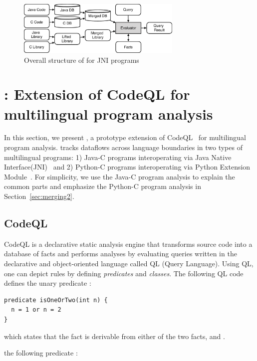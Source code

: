 \begin{figure}[t]
  \centering
  \vspace{2mm}
  \includegraphics[width=0.7\textwidth]{img/codeql.pdf}
  \caption{Overall structure of \ours for JNI programs}
  \label{fig:codeql}
\end{figure}

\section{\ours: Extension of CodeQL for multilingual program analysis}\label{sec:impl}
In this section, we present \ours, a prototype extension of
CodeQL~\cite{codeql} for multilingual program analysis.  \ours tracks dataflows
across language boundaries in two types of multilingual programs: 1) Java-C
programs interoperating via Java Native Interface(JNI)~\cite{jnispec} and 2)
Python-C programs interoperating via Python Extension Module~\cite{pyext}.  For
simplicity, we use the Java-C program analysis to explain the common parts and
emphasize the Python-C program analysis in Section~\ref{sec:merging2}.

\subsection{CodeQL}
CodeQL is a declarative static analysis engine that transforms source code into
a database of facts and performs analyses by evaluating queries written in the
declarative and object-oriented language called QL (Query Language). Using QL,
one can depict rules by defining \textit{ predicates} and \textit{ classes}. The following
QL code defines the  unary predicate :

\begin{lstlisting}[style=codeql,xleftmargin=2.5em]
predicate isOneOrTwo(int n) {
  n = 1 or n = 2
}
\end{lstlisting}

\noindent
which states that the fact  is derivable from either
of the two facts,  and .

 the following predicate :

